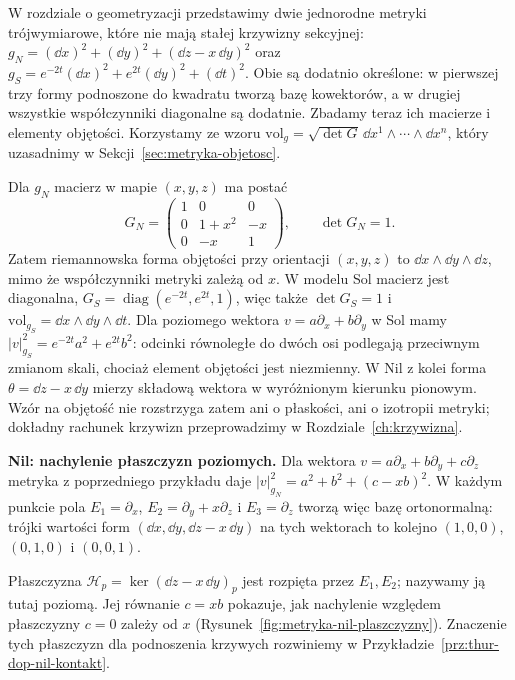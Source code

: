 \begin{przyklad}
\label{prz:thur-dop-metryki-nil-sol}
W rozdziale o geometryzacji przedstawimy dwie jednorodne metryki
trójwymiarowe, które nie mają stałej krzywizny sekcyjnej:
$g_N=(\dd x)^2+(\dd y)^2+(\dd z-x\,\dd y)^2$ oraz
$g_S=e^{-2t}(\dd x)^2+e^{2t}(\dd y)^2+(\dd t)^2$.
Obie są dodatnio określone: w pierwszej trzy formy podnoszone
do kwadratu tworzą bazę kowektorów, a w drugiej wszystkie
współczynniki diagonalne są dodatnie. Zbadamy teraz ich macierze
i elementy objętości. Korzystamy ze wzoru
$\mathrm{vol}_g=\sqrt{\det G}\,\dd x^1\wedge\cdots\wedge\dd x^n$,
który uzasadnimy w Sekcji~\ref{sec:metryka-objetosc}.

Dla $g_N$ macierz w mapie $(x,y,z)$ ma postać
\[
G_N=\begin{pmatrix}1&0&0\\0&1+x^2&-x\\0&-x&1\end{pmatrix},
\qquad \det G_N=1.
\]
Zatem riemannowska forma objętości przy orientacji $(x,y,z)$ to
$\dd x\wedge\dd y\wedge\dd z$, mimo że współczynniki metryki
zależą od $x$. W modelu Sol macierz jest diagonalna,
$G_S=\operatorname{diag}(e^{-2t},e^{2t},1)$,
więc także $\det G_S=1$ i
$\mathrm{vol}_{g_S}=\dd x\wedge\dd y\wedge\dd t$.
Dla poziomego wektora $v=a\partial_x+b\partial_y$ w Sol
mamy $|v|_{g_S}^2=e^{-2t}a^2+e^{2t}b^2$:
odcinki równoległe do dwóch osi podlegają przeciwnym zmianom
skali, chociaż element objętości jest niezmienny.
W Nil z kolei forma $\theta=\dd z-x\,\dd y$ mierzy składową
wektora w wyróżnionym kierunku pionowym.
Wzór na objętość nie rozstrzyga zatem ani o płaskości,
ani o izotropii metryki; dokładny rachunek krzywizn
przeprowadzimy w Rozdziale~\ref{ch:krzywizna}.
\end{przyklad}

\textbf{Nil: nachylenie płaszczyzn poziomych.}
Dla wektora $v=a\partial_x+b\partial_y+c\partial_z$
metryka z poprzedniego przykładu daje
$|v|_{g_N}^2=a^2+b^2+(c-xb)^2$.
W każdym punkcie pola
$E_1=\partial_x$, $E_2=\partial_y+x\partial_z$
i $E_3=\partial_z$ tworzą więc bazę ortonormalną:
trójki wartości form $(\dd x,\dd y,\dd z-x\,\dd y)$
na tych wektorach to kolejno $(1,0,0)$, $(0,1,0)$ i $(0,0,1)$.

Płaszczyzna $\mathcal H_p=\ker(\dd z-x\,\dd y)_p$
jest rozpięta przez $E_1,E_2$; nazywamy ją tutaj poziomą.
Jej równanie $c=xb$ pokazuje, jak nachylenie
względem płaszczyzny $c=0$ zależy od $x$
(Rysunek~\ref{fig:metryka-nil-plaszczyzny}).
Znaczenie tych płaszczyzn dla podnoszenia krzywych
rozwiniemy w Przykładzie~\ref{prz:thur-dop-nil-kontakt}.

